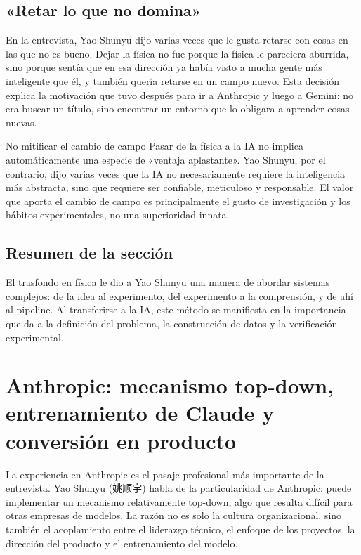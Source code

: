 \documentclass[a4paper]{article}
\begin{document}
\subsection{«Retar lo que no domina»}

En la entrevista, Yao Shunyu dijo varias veces que le gusta retarse con cosas en las que no es bueno. Dejar la física no fue porque la física le pareciera aburrida, sino porque sentía que en esa dirección ya había visto a mucha gente más inteligente que él, y también quería retarse en un campo nuevo. Esta decisión explica la motivación que tuvo después para ir a Anthropic y luego a Gemini: no era buscar un título, sino encontrar un entorno que lo obligara a aprender cosas nuevas.

\begin{warningbox}{No mitificar el cambio de campo}
Pasar de la física a la IA no implica automáticamente una especie de «ventaja aplastante». Yao Shunyu, por el contrario, dijo varias veces que la IA no necesariamente requiere la inteligencia más abstracta, sino que requiere ser confiable, meticuloso y responsable. El valor que aporta el cambio de campo es principalmente el gusto de investigación y los hábitos experimentales, no una superioridad innata.
\end{warningbox}

\subsection{Resumen de la sección}

El trasfondo en física le dio a Yao Shunyu una manera de abordar sistemas complejos: de la idea al experimento, del experimento a la comprensión, y de ahí al pipeline. Al transferirse a la IA, este método se manifiesta en la importancia que da a la definición del problema, la construcción de datos y la verificación experimental.
\section{Anthropic: mecanismo top-down, entrenamiento de Claude y conversión en producto}

La experiencia en Anthropic es el pasaje profesional más importante de la entrevista. Yao Shunyu (姚顺宇) habla de la particularidad de Anthropic: puede implementar un mecanismo relativamente top-down, algo que resulta difícil para otras empresas de modelos. La razón no es solo la cultura organizacional, sino también el acoplamiento entre el liderazgo técnico, el enfoque de los proyectos, la dirección del producto y el entrenamiento del modelo.
\end{document}
